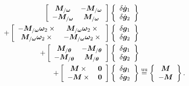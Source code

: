 \documentclass[10pt,dvips,fleqn,subeqn]{report}
\newcommand{\T}[1]{\bm{#1}}
\newcommand{\equu}{\overset{\text{uu}}{=}}
\begin{document}
\begin{align}
	\sqbr{\matr{cc}{
		\T{M}_{/\T{\omega}} & - \T{M}_{/\T{\omega}} \\
		- \T{M}_{/\T{\omega}} & \T{M}_{/\T{\omega}}
	}}\cubr{\cvvect{
		\delta\dot{\T{g}}_1 \\
		\delta\dot{\T{g}}_2
	}} & \nonumber \\
	+ \sqbr{\matr{cc}{
		- \T{M}_{/\T{\omega}} \T{\omega}_2 \times{} & \T{M}_{/\T{\omega}} \T{\omega}_2 \times{} \\
		\T{M}_{/\T{\omega}} \T{\omega}_2 \times{} & - \T{M}_{/\T{\omega}} \T{\omega}_2 \times{}
	}} \cubr{\cvvect{
		\delta\T{g}_1 \\
		\delta\T{g}_2 
	}} & \nonumber \\
	+ \sqbr{\matr{cc}{
		\T{M}_{/\T{\theta}} & - \T{M}_{/\T{\theta}} \\
		- \T{M}_{/\T{\theta}} & \T{M}_{/\T{\theta}}
	}} \cubr{\cvvect{
		\delta\T{g}_1 \\
		\delta\T{g}_2 
	}} & \nonumber \\
	+ \sqbr{\matr{cc}{
		\T{M}\times{} & \T{0} \\
		- \T{M}\times{} & \T{0}
	}} \cubr{\cvvect{
		\delta\T{g}_1 \\
		\delta\T{g}_2 
	}} &\equu \cubr{\cvvect{
		\T{M} \\
		- \T{M}
	}} .
\end{align}
\end{document}
